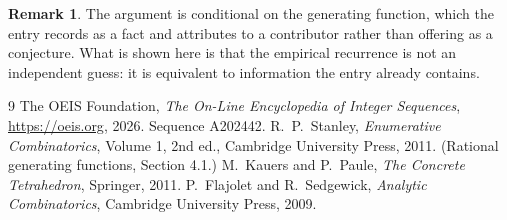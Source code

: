 \documentclass[11pt,a4paper]{article}
\theoremstyle{plain}
\theoremstyle{definition}
\newtheorem{remark}[theorem]{Remark}
\begin{document}
\begin{remark}
The argument is conditional on the generating function, which the entry records as a fact and
attributes to a contributor rather than offering as a conjecture. What is shown here is that
the empirical recurrence is not an independent guess: it is equivalent to information the
entry already contains.
\end{remark}

\begin{thebibliography}{9}
 The OEIS Foundation, \emph{The On-Line Encyclopedia of Integer
Sequences}, \url{https://oeis.org}, 2026. Sequence A202442.
 R.~P.~Stanley, \emph{Enumerative Combinatorics}, Volume 1, 2nd ed.,
Cambridge University Press, 2011. (Rational generating functions, Section 4.1.)
 M.~Kauers and P.~Paule, \emph{The Concrete Tetrahedron}, Springer, 2011.
 P.~Flajolet and R.~Sedgewick, \emph{Analytic Combinatorics}, Cambridge
University Press, 2009.
\end{thebibliography}
\end{document}
